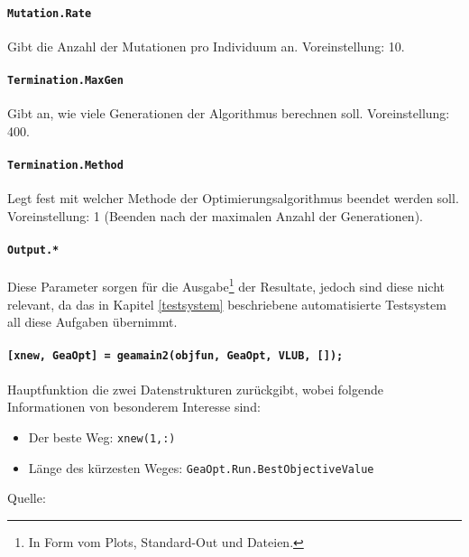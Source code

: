 \paragraph{{\tt Mutation.Rate}} Gibt die Anzahl der Mutationen
pro Individuum an.
Voreinstellung: 10.

\paragraph{{\tt Termination.MaxGen}} Gibt an, wie viele Generationen der
Algorithmus berechnen soll.
Voreinstellung: 400.

\paragraph{{\tt Termination.Method}} Legt fest mit welcher Methode der
Optimierungsalgorithmus beendet werden soll.
Voreinstellung: 1 (Beenden nach der maximalen Anzahl der Generationen).

\paragraph{{\tt Output.*}} Diese Parameter sorgen für die
Ausgabe\footnote{In Form vom Plots, Standard-Out und Dateien.} der Resultate,
jedoch sind diese nicht relevant, da das in Kapitel \ref{testsystem} beschriebene
automatisierte Testsystem all diese Aufgaben übernimmt.

\paragraph{{\tt [xnew, GeaOpt] = geamain2(objfun, GeaOpt, VLUB, []);}}
Hauptfunktion die zwei Datenstrukturen zurückgibt, wobei folgende
Informationen von besonderem Interesse sind:

\begin{itemize}
  \item Der beste Weg: {\tt xnew(1,:)}
  \item Länge des kürzesten Weges: {\tt GeaOpt.Run.BestObjectiveValue}
\end{itemize}

\noindent Quelle: \citep{geatbx-options}

